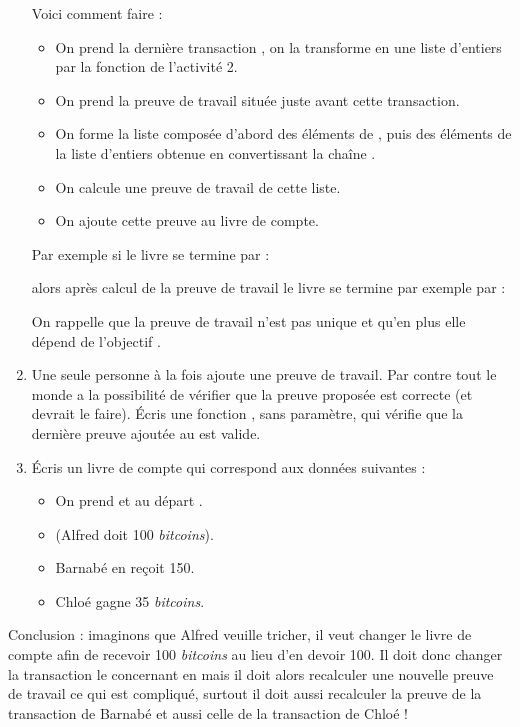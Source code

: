 \documentclass[11pt,class=report,crop=false]{standalone}
\begin{document}
\begin{activite}
\begin{enumerate}
Voici comment faire :
  \begin{itemize}
    \item On prend la dernière transaction , on la transforme en une liste d'entiers par la fonction  de l'activité 2.
    \item On prend la preuve de travail  située juste avant cette transaction.
    \item On forme la liste  composée d'abord des éléments de , puis des éléments de la liste d'entiers obtenue en convertissant la chaîne .
    \item On calcule une preuve de travail de cette liste.
    \item  On ajoute cette preuve au livre de compte.
  \end{itemize}
  Par exemple si le livre se termine par :\\
  \centerline{}
  alors après calcul de la preuve de travail le livre se termine par exemple par :\\
  \centerline{}  
     On rappelle que la preuve de travail n'est pas unique et qu'en plus elle dépend 
   de l'objectif .
   
   \item Une seule personne à la fois ajoute une preuve de travail. Par contre tout le monde a la possibilité de vérifier que la preuve proposée est correcte (et devrait le faire). 
	Écris une fonction , sans paramètre, qui vérifie que la dernière preuve ajoutée au  est valide.
	
	\item Écris un livre de compte qui correspond aux données suivantes :
	\begin{itemize}
	  \item On prend  et au départ .
	  \item {} (Alfred doit 100 \emph{bitcoins}).
	  \item Barnabé en reçoit 150.
	  \item Chloé gagne 35 \emph{bitcoins}.
	\end{itemize}

\end{enumerate} 

Conclusion : imaginons que Alfred veuille tricher, il veut changer le livre de compte afin de recevoir 100 \emph{bitcoins} au lieu d'en devoir 100. Il doit donc changer la transaction le concernant en  mais il doit alors recalculer une nouvelle preuve de travail ce qui est compliqué, surtout il doit aussi recalculer la preuve de la transaction de Barnabé et aussi celle de la transaction de Chloé ! 


\end{activite}
\end{document}
